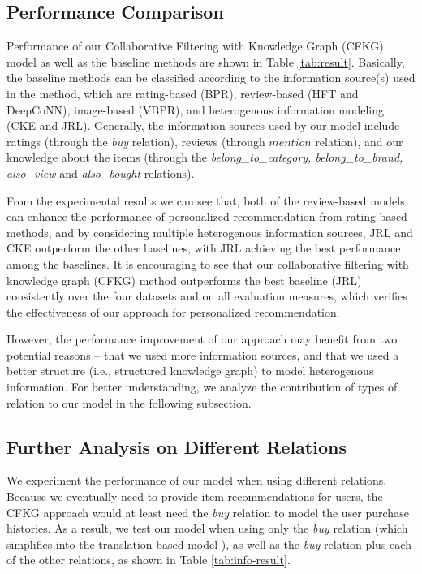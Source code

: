 \documentclass[algorithms,article,accept,moreauthors,pdftex,10pt,a4paper]{Definitions/mdpi}
\begin{document}
\subsection{Performance Comparison}
Performance of our Collaborative Filtering with Knowledge Graph (CFKG) model as well as the baseline methods are shown in Table \ref{tab:result}. Basically, the baseline methods can be classified according to the information source(s) used in the method, which are rating-based (BPR), review-based (HFT and DeepCoNN), image-based (VBPR), and heterogenous information modeling (CKE and JRL). Generally, the information sources used by our model include ratings (through the \textit{buy} relation), reviews (through $mention$ relation), and our knowledge about the items (through the \textit{belong\_to\_category, belong\_to\_brand, also\_view} and \textit{also\_bought} relations).

From the experimental results we can see that, both of the review-based models can enhance the performance of personalized recommendation from rating-based methods, and by considering multiple heterogenous information sources, JRL and CKE outperform the other baselines, with JRL achieving the best performance among the baselines. It is encouraging to see that our collaborative filtering with knowledge graph (CFKG) method outperforms the best baseline (JRL) consistently over the four datasets and on all evaluation measures, which verifies the effectiveness of our approach for personalized recommendation. 


However, the performance improvement of our approach may benefit from two potential reasons -- that we used more information sources, and that we used a better structure (i.e., structured knowledge graph) to model heterogenous information. For better understanding, we analyze the contribution of types of relation to our model in the following subsection.

\subsection{Further Analysis on Different Relations}
We experiment the performance of our model when using different relations. Because we eventually need to provide item recommendations for users, the CFKG approach would at least need the \textit{buy} relation to model the user purchase histories. As a result, we test our model when using only the \textit{buy} relation (which simplifies into the translation-based model \cite{he2017translation}), as well as the \textit{buy} relation plus each of the other relations, as shown in Table \ref{tab:info-result}.
\end{document}
